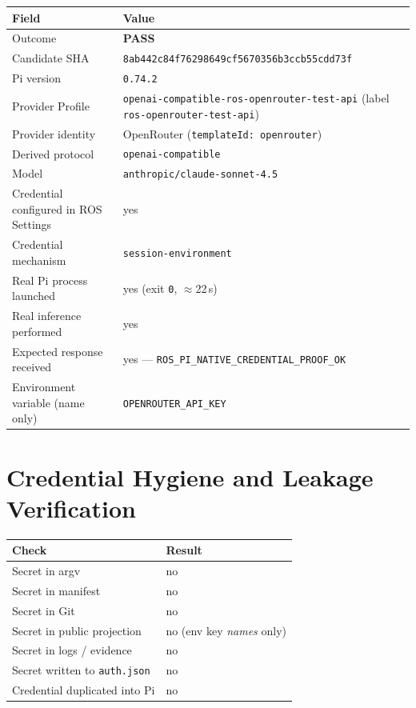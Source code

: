 \documentclass[11pt]{article}
\newcommand{\code}[1]{\texttt{#1}}
\begin{document}
\begin{longtable}{@{}l p{9.5cm}@{}}
\toprule
\textbf{Field} & \textbf{Value} \\
\midrule
\endhead
Outcome & \textbf{PASS} \\
Candidate SHA & \code{8ab442c84f76298649cf5670356b3ccb55cdd73f} \\
Pi version & \code{0.74.2} \\
Provider Profile & \code{openai-compatible-ros-openrouter-test-api} (label
  \code{ros-openrouter-test-api}) \\
Provider identity & OpenRouter (\code{templateId: openrouter}) \\
Derived protocol & \code{openai-compatible} \\
Model & \code{anthropic/claude-sonnet-4.5} \\
Credential configured in ROS Settings & yes \\
Credential mechanism & \code{session-environment} \\
Real Pi process launched & yes (exit \code{0}, $\approx$22\,s) \\
Real inference performed & yes \\
Expected response received & yes --- \code{ROS\_PI\_NATIVE\_CREDENTIAL\_PROOF\_OK} \\
Environment variable (name only) & \code{OPENROUTER\_API\_KEY} \\
\bottomrule
\end{longtable}

\section{Credential Hygiene and Leakage Verification}

\begin{longtable}{@{}l l@{}}
\toprule
\textbf{Check} & \textbf{Result} \\
\midrule
\endhead
Secret in argv & no \\
Secret in manifest & no \\
Secret in Git & no \\
Secret in public projection & no (env key \emph{names} only) \\
Secret in logs / evidence & no \\
Secret written to \code{auth.json} & no \\
Credential duplicated into Pi & no \\
\bottomrule
\end{longtable}
\end{document}
